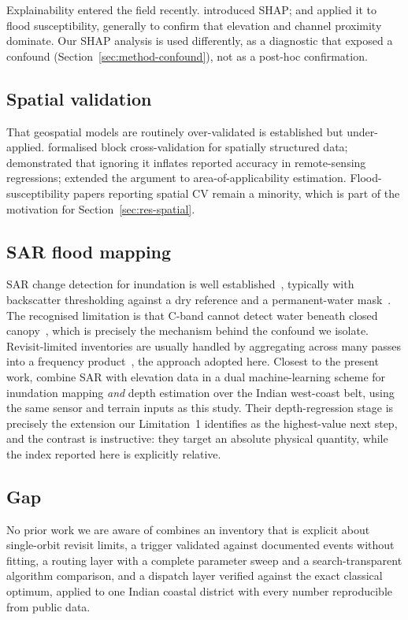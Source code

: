 \documentclass[journal]{IEEEtran}
\begin{document}
Explainability entered the field recently. \citet{lundberg2017} introduced SHAP;
\citet{aydin2022} and \citet{seydi2023} applied it to flood susceptibility,
generally to confirm that elevation and channel proximity dominate. Our SHAP
analysis is used differently, as a diagnostic that exposed a confound
(Section~\ref{sec:method-confound}), not as a post-hoc confirmation.

\subsection{Spatial validation}
That geospatial models are routinely over-validated is established but
under-applied. \citet{roberts2017} formalised block cross-validation for
spatially structured data; \citet{ploton2020} demonstrated that ignoring it
inflates reported accuracy in remote-sensing regressions; \citet{meyer2021}
extended the argument to area-of-applicability estimation. Flood-susceptibility
papers reporting spatial CV remain a minority, which is part of the motivation
for Section~\ref{sec:res-spatial}.

\subsection{SAR flood mapping}
SAR change detection for inundation is well established~\citep{martinis2009,
twele2016,shen2019}, typically with backscatter thresholding against a dry
reference and a permanent-water mask~\citep{pekel2016}. The recognised limitation
is that C-band cannot detect water beneath closed
canopy~\citep{townsend2002,tsyganskaya2018}, which is precisely the mechanism
behind the confound we isolate. Revisit-limited inventories are usually handled
by aggregating across many passes into a frequency
product~\citep{pekel2016,donchyts2016}, the approach adopted here.
Closest to the present work, \citet{sadhwani2026} combine SAR with elevation data
in a dual machine-learning scheme for inundation mapping \emph{and} depth
estimation over the Indian west-coast belt, using the same sensor and terrain
inputs as this study. Their depth-regression stage is precisely the extension our
Limitation~1 identifies as the highest-value next step, and the contrast is
instructive: they target an absolute physical quantity, while the index reported
here is explicitly relative.

\subsection{Gap}
No prior work we are aware of combines an inventory that is explicit about
single-orbit revisit limits, a trigger validated against documented events
without fitting, a routing layer with a complete parameter sweep and a
search-transparent algorithm comparison, and a dispatch layer verified against
the exact classical optimum, applied to one Indian coastal district with every
number reproducible from public data.
\end{document}
